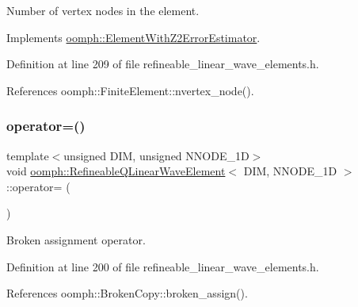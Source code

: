 Number of vertex nodes in the element. 



Implements \hyperlink{classoomph_1_1ElementWithZ2ErrorEstimator_a19495a0e77ef4ff35f15fdf7913b4077}{oomph\+::\+Element\+With\+Z2\+Error\+Estimator}.



Definition at line 209 of file refineable\+\_\+linear\+\_\+wave\+\_\+elements.\+h.



References oomph\+::\+Finite\+Element\+::nvertex\+\_\+node().

\mbox{\label{classoomph_1_1RefineableQLinearWaveElement_a6e64a081bb96e0e14982d8fa9b678d5a}} 
\subsubsection{\texorpdfstring{operator=()}{operator=()}}
{\footnotesize\ttfamily template$<$unsigned D\+IM, unsigned N\+N\+O\+D\+E\+\_\+1D$>$ \\
void \hyperlink{classoomph_1_1RefineableQLinearWaveElement}{oomph\+::\+Refineable\+Q\+Linear\+Wave\+Element}$<$ D\+IM, N\+N\+O\+D\+E\+\_\+1D $>$\+::operator= (\begin{DoxyParamCaption}\item[{const \hyperlink{classoomph_1_1RefineableQLinearWaveElement}{Refineable\+Q\+Linear\+Wave\+Element}$<$ D\+IM, N\+N\+O\+D\+E\+\_\+1D $>$ \&}]{ }\end{DoxyParamCaption})\hspace{0.3cm}{\ttfamily [inline]}}



Broken assignment operator. 



Definition at line 200 of file refineable\+\_\+linear\+\_\+wave\+\_\+elements.\+h.



References oomph\+::\+Broken\+Copy\+::broken\+\_\+assign().

\mbox{\label{classoomph_1_1RefineableQLinearWaveElement_a4af9a35f433a96aec249cd77a7cd43ee}} 
